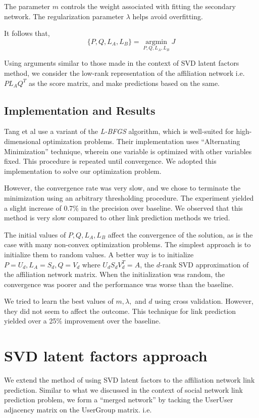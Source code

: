 \documentclass{report}
\begin{document}
The parameter $m$ controls the weight associated with fitting the secondary network. The regularization parameter $\lambda$ helps  avoid overfitting.

It follows that,
\begin{equation*}
\{P, Q, L_A, L_B\} = \underset{P, Q, L_A, L_B}{\operatorname{argmin}} J
\end{equation*} 

Using arguments similar to those made in the context of SVD latent factors method, we consider the low-rank representation of the affiliation network i.e. $PL_AQ^T$ as the score matrix, and make predictions based on the same.


\subsection{Implementation and Results}
Tang\cite{tangLMF} et al use a variant of the \textit{L-BFGS} algorithm, which is well-suited for high-dimensional optimization problems. Their implementation uses ``Alternating Minimization'' technique, wherein one variable is optimized with other variables fixed. This procedure is repeated until convergence. We adopted this implementation to solve our optimization problem. 

However, the convergence rate was very slow, and we chose to terminate the minimization using an arbitrary thresholding procedure. The experiment yielded a slight increase of 0.7\% in the precision over baseline. We observed that this method is very slow compared to other link prediction methods we tried.

The initial values of $P, Q, L_A, L_B$ affect the convergence of the solution, as is the case with many non-convex optimization problems. The simplest approach is to initialize them to random values. A better way is to initialize $P = U_d, L_A=S_d, Q = V_d$ where $U_dS_dV_d^T = A$, the $d$-rank SVD approximation of the affiliation network matrix. When the initialization was random, the convergence was poorer and the performance was worse than the baseline.

We tried to learn the best values of $m, \lambda,$ and $d$ using cross validation. However, they did not seem to affect the outcome. This technique for link prediction yielded over a 25\% improvement over the baseline.

\section{SVD latent factors approach}
We extend the method of using SVD latent factors to the affiliation network link prediction. Similar to what we discussed in the context of social network link prediction problem, we form a ``merged network'' by tacking the UserUser adjacency matrix on the UserGroup matrix. i.e.
\end{document}
